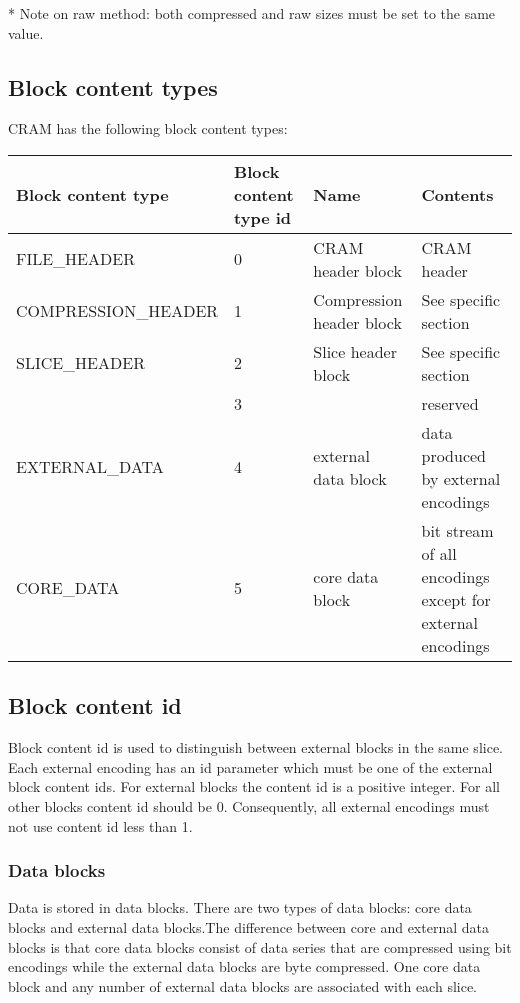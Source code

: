 \documentclass[a4paper]{article}
\begin{document}
* Note on raw method: both compressed and raw sizes must be set to the same value.

\subsection{\textbf{Block content types}}

CRAM has the following block content types:

\begin{threeparttable}[t]
\begin{tabular}{|>{\raggedright}p{143pt}|>{\raggedright}p{45pt}|>{\raggedright}p{116pt}|>{\raggedright}p{114pt}|}
\hline
\textbf{Block content type} & \textbf{Block content type id} & \textbf{Name} & \textbf{Contents}\tabularnewline
\hline
FILE\_HEADER & 0 & CRAM header block & CRAM header\tabularnewline
\hline
COMPRESSION\_HEADER & 1 & Compression header block & See specific section\tabularnewline
\hline
SLICE\_HEADER & 2 & Slice header block & See specific section\tabularnewline
\hline
 & 3 &  & reserved\tabularnewline
\hline
EXTERNAL\_DATA & 4 & external data block & data produced by external encodings\tabularnewline
\hline
CORE\_DATA & 5 & core data block & bit stream of all encodings except for external encodings\tabularnewline
\hline
\end{tabular}
\end{threeparttable}

\subsection{\textbf{Block content id}}

Block content id is used to distinguish between external blocks in the same slice. 
Each external encoding has an id parameter which must be one of the external block 
content ids. For external blocks the content id is a positive integer. For all 
other blocks content id should be 0. Consequently, all external encodings must 
not use content id less than 1. 

\subsubsection*{Data blocks}

Data is stored in data blocks. There are two types of data blocks: core data blocks 
and external data blocks.The difference between core and external data blocks is 
that core data blocks consist of data series that are compressed using bit encodings 
while the external data blocks are byte compressed. One core data block and any 
number of external data blocks are associated with each slice.
\end{document}
